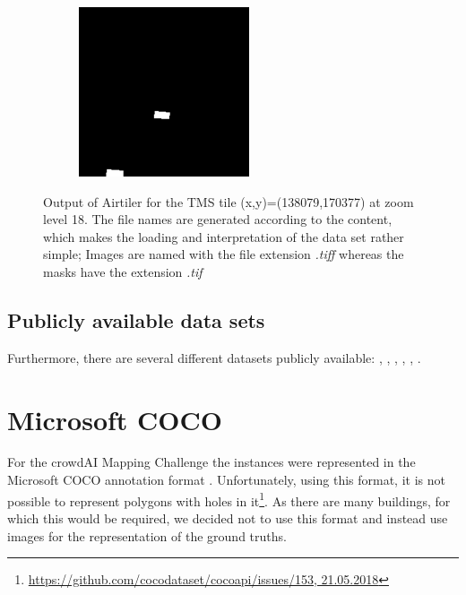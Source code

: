 \begin{figure}[H]
\begin{subfigure}[b]{0.475\textwidth}
            \includegraphics[width=\textwidth]{chapters/theoretical_and_experimental_results/images/18_138079_170377_swimming_pool.png}
            \caption{}
            \label{fig:results:airtiler_output_pool}
        \end{subfigure}
        \caption{Output of Airtiler for the TMS tile (x,y)=(138079,170377) at zoom level 18. The file names are generated according to the content, which makes the loading and interpretation of the data set rather simple; Images are named with the file extension \textit{.tiff} whereas the masks have the extension \textit{.tif}}
        \label{fig:results:airtiler_output_description}
    \end{figure}

\subsection{Publicly available data sets}
Furthermore, there are several different datasets publicly available: \cite{VolodymyrMnih.2013}, \cite{spacenet}, \cite{isprs-vaihingen}, \cite{isprs-potsdam}, \cite{Helber.20170831}, \cite{deepsat}.



\section{Microsoft COCO}
For the crowdAI Mapping Challenge \cite{mappingchallenge} the instances were represented in the Microsoft COCO annotation format \cite{cocoformat}. Unfortunately, using this format, it is not possible to represent polygons with holes in it\footnote{\url{https://github.com/cocodataset/cocoapi/issues/153, 21.05.2018}}. As there are many buildings, for which this would be required, we decided not to use this format and instead use images for the representation of the ground truths.

